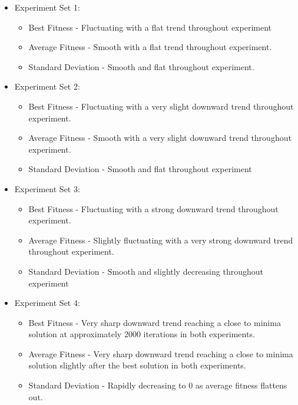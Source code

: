 \documentclass[sigconf]{acmart}
\begin{document}
            \begin{itemize}
                \item Experiment Set 1:
                \begin{itemize}
                    \item Best Fitness - Fluctuating with a flat trend throughout experiment
                    \item Average Fitness - Smooth with a flat trend throughout experiment.
                    \item Standard Deviation - Smooth and flat throughout experiment.\newline
                \end{itemize}
                \item Experiment Set 2:
                \begin{itemize}
                    \item Best Fitness - Fluctuating with a very slight downward trend throughout experiment.
                    \item Average Fitness - Smooth with a very slight downward trend throughout experiment.
                    \item Standard Deviation - Smooth and flat throughout experiment\newline
                \end{itemize}
                \item Experiment Set 3:
                \begin{itemize}
                    \item Best Fitness - Fluctuating with a strong downward trend throughout experiment.
                    \item Average Fitness - Slightly fluctuating with a very strong downward trend throughout experiment.
                    \item Standard Deviation - Smooth and slightly decreasing throughout experiment\newline
                \end{itemize}
                \item Experiment Set 4:
                \begin{itemize}
                    \item Best Fitness - Very sharp downward trend reaching a close to minima solution at approximately 2000 iterations in both experiments.
                    \item Average Fitness - Very sharp downward trend reaching a close to minima solution slightly after the best solution in both experiments.
                    \item Standard Deviation - Rapidly decreasing to 0 as average fitness flattens out.\newline
                \end{itemize}
            \end{itemize}
\end{document}
